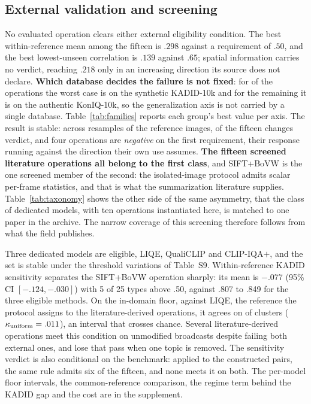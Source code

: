 \subsection{External validation and screening}\label{sec:screen_results}

No evaluated operation clears either external eligibility condition. The best
within-reference mean among the fifteen is $.298$ against a requirement of $.50$, and the
best lowest-unseen correlation is $.139$ against $.65$; spatial information carries no verdict, reaching $.218$ only in an increasing direction its source does not declare. \textbf{Which database decides the failure is not fixed}: for \basePiorKadid{} of the \fontesDaLiteratura{} operations the worst case is on the synthetic KADID-10k and for the remaining \basePiorKoniq{} it is on the authentic KonIQ-10k, so the generalization axis is not carried by a single database. Table~\ref{tab:families} reports each
group's best value per axis. The result is stable: across  resamples of the reference images,  of the fifteen changes verdict, and four operations are \emph{negative} on the first requirement, their response running against the direction their own use assumes. \textbf{The fifteen screened literature operations all belong to the first class}, and SIFT+BoVW is the one screened member of the second: the isolated-image protocol admits scalar per-frame statistics, and that is what the summarization literature supplies. Table~\ref{tab:taxonomy} shows the other side of the same asymmetry, that the class of dedicated models, with ten operations instantiated here, is matched to one paper in the archive. The narrow coverage of this screening therefore follows from what the field publishes.



Three dedicated models are eligible, LIQE, QualiCLIP and CLIP-IQA$+$, and the set is stable
under the threshold variations of Table~S9. Within-reference KADID sensitivity separates the
SIFT+BoVW operation sharply: its mean is $-.077$ (95\% CI $[-.124,-.030]$) with 5 of 25
types above .50, against .807 to .849 for the three eligible methods. On the in-domain
floor, against LIQE, the reference the protocol assigns to the literature-derived
operations, it agrees on \subResta{} of \pisoDe{} clusters
($\kappa_{\mathrm{uniform}}=.011{}$), an interval that crosses chance. Several
literature-derived operations meet this condition on unmodified broadcasts despite failing
both external ones, and \pisoFrageis{} lose that pass when one topic is removed. The sensitivity verdict is also conditional on the benchmark: applied to the constructed pairs, the same rule admits six of the fifteen, and none meets it on both. The
per-model floor intervals, the common-reference comparison, the regime term behind the
KADID gap and the cost are in the supplement.

